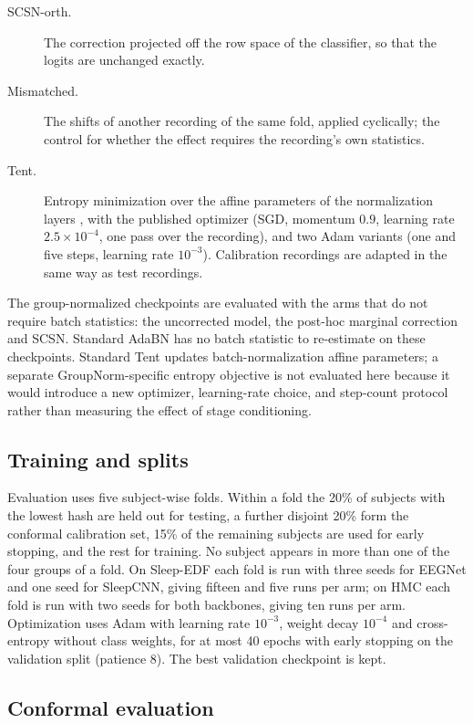 \begin{description}
  \item[SCSN-orth.] The correction projected off the row space of the
  classifier, so that the logits are unchanged exactly.
  \item[Mismatched.] The shifts of another recording of the same fold, applied
  cyclically; the control for whether the effect requires the recording's own
  statistics.
  \item[Tent.] Entropy minimization over the affine parameters of the
  normalization layers \citep{wang2021tent}, with the published optimizer
  (SGD, momentum $0.9$, learning rate $2.5\times10^{-4}$, one pass over the
  recording), and two Adam variants (one and five steps, learning rate
  $10^{-3}$). Calibration recordings are adapted in the same way as test
  recordings.
\end{description}

The group-normalized checkpoints are evaluated with the arms that do not
require batch statistics: the uncorrected model, the post-hoc marginal
correction and SCSN. Standard AdaBN has no batch statistic to re-estimate on
these checkpoints. Standard Tent updates batch-normalization affine
parameters; a separate GroupNorm-specific entropy objective is not evaluated
here because it would introduce a new optimizer, learning-rate choice, and
step-count protocol rather than measuring the effect of stage conditioning.

\subsection{Training and splits}

Evaluation uses five subject-wise folds. Within a fold the 20\% of subjects
with the lowest hash are held out for testing, a further disjoint 20\% form
the conformal calibration set, 15\% of the remaining subjects are used for
early stopping, and the rest for training. No subject appears in more than one
of the four groups of a fold. On Sleep-EDF each fold is run with three seeds
for EEGNet and one seed for SleepCNN, giving fifteen and five runs per arm;
on HMC each fold is run with two seeds for both backbones, giving ten runs per
arm. Optimization uses Adam with learning rate
$10^{-3}$, weight decay $10^{-4}$ and cross-entropy without class weights, for
at most 40 epochs with early stopping on the validation split (patience 8).
The best validation checkpoint is kept.

\subsection{Conformal evaluation}

